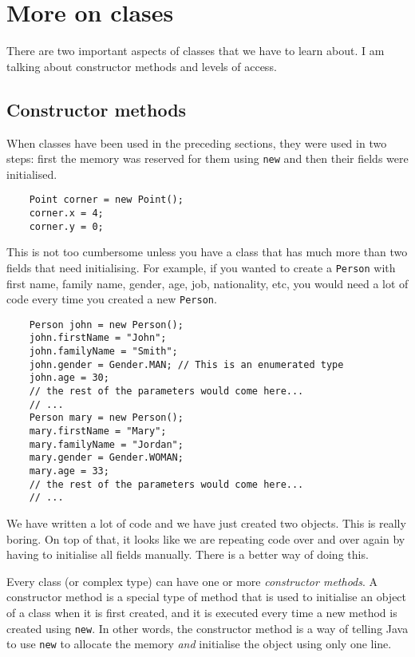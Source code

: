 
\section{More on clases}
\label{sec:more-clases}

There are two important aspects of classes that we have to learn
about. I am talking about constructor methods and levels of access. 

\subsection{Constructor methods}
\label{sec:constructor-methods}

When classes have been used in the preceding sections, they were used
in two steps: first the memory was reserved for them using \verb+new+
and then their fields were initialised. 

\begin{verbatim}
    Point corner = new Point();
    corner.x = 4;
    corner.y = 0;
\end{verbatim}

This is not too cumbersome unless you have a class that has much more
than two fields that need initialising. For example, if you wanted to
create a \verb+Person+ with first name, family name, gender, age, job,
nationality, etc, you would need a lot of code every time you created
a new \verb+Person+. 

\begin{verbatim}
    Person john = new Person();
    john.firstName = "John";
    john.familyName = "Smith";
    john.gender = Gender.MAN; // This is an enumerated type
    john.age = 30;
    // the rest of the parameters would come here...
    // ...
    Person mary = new Person();
    mary.firstName = "Mary";
    mary.familyName = "Jordan";
    mary.gender = Gender.WOMAN;
    mary.age = 33;
    // the rest of the parameters would come here...
    // ...
\end{verbatim}

We have written a lot of code and we have just created two
objects. This is really boring. On top of that, it looks like we are
repeating code over and over again by having to initialise all fields
manually. There is a better way of doing this. 

Every class (or complex type) can have one or more \emph{constructor
  methods}. A constructor method is a special type of method that is
used to initialise an object of a class when it is first created, and
it is executed every time a new method is created using \verb+new+. In
other words, the constructor method is a way of telling Java to use
\verb+new+ to allocate the memory \emph{and} initialise the object
using only one line. 

